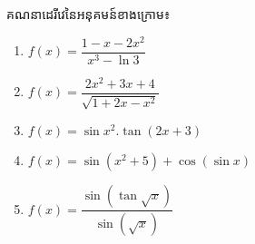 \documentclass[a4paper,12pt]{article}
\begin{document}
\begin{exercise}
	គណនាដេរីវេនៃអនុគមន៍ខាងក្រោម៖
	\begin{multicols}{2}
		\begin{enumerate}
			\item $f(x)=\dfrac{1-x-2x^2}{x^3-\ln 3}$
			\item $f(x)=\dfrac{2x^2+3x+4}{\sqrt{1+2x-x^2}}$
			\item $f(x)=\sin x^2.\tan (2x+3)$
			\item $f(x)=\sin (x^2+5)+\cos (\sin x)$
			\item $f(x)=\dfrac{\sin (\tan \sqrt{x})}{\sin (\sqrt{x})}$
		\end{enumerate}
	\end{multicols}
\end{exercise}
\answer
\end{document}
